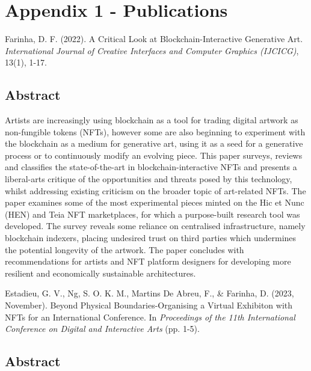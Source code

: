 \chapter*{Appendix 1 - Publications}
\label{chap:publication}





Farinha, D. F. (2022). A Critical Look at Blockchain-Interactive Generative Art. \emph{International Journal of Creative Interfaces and Computer Graphics (IJCICG)}, 13(1), 1-17.

\section*{Abstract}

Artists are increasingly using blockchain as a tool for trading digital artwork as non-fungible tokens (NFTs), however some are also beginning to experiment with the blockchain as a medium for generative art, using it as a seed for a generative process or to continuously modify an evolving piece. This paper surveys, reviews and classifies the state-of-the-art in blockchain-interactive NFTs and presents a liberal-arts critique of the opportunities and threats posed by this technology, whilst addressing existing criticism on the broader topic of art-related NFTs. The paper examines some of the most experimental pieces minted on the Hic et Nunc (HEN) and Teia NFT marketplaces, for which a purpose-built research tool was developed. The survey reveals some reliance on centralised infrastructure, namely blockchain indexers, placing undesired trust on third parties which undermines the potential longevity of the artwork. The paper concludes with recommendations for artists and NFT platform designers for developing more resilient and economically sustainable architectures.


\clearpage


\noindent Estadieu, G. V., Ng, S. O. K. M., Martins De Abreu, F., \& Farinha, D. (2023, November). Beyond Physical Boundaries-Organising a Virtual Exhibiton with NFTs for an International Conference. In \emph{Proceedings of the 11th International Conference on Digital and Interactive Arts} (pp. 1-5).

\section*{Abstract}

